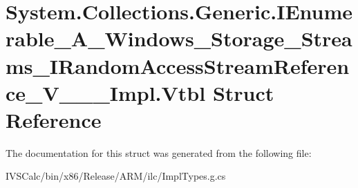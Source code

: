 \hypertarget{struct_system_1_1_collections_1_1_generic_1_1_i_enumerable___a___windows___storage___streams___i815040533663abdf6b7703e78a1bac85}{}\section{System.\+Collections.\+Generic.\+I\+Enumerable\+\_\+\+A\+\_\+\+Windows\+\_\+\+Storage\+\_\+\+Streams\+\_\+\+I\+Random\+Access\+Stream\+Reference\+\_\+\+V\+\_\+\+\_\+\+\_\+\+Impl.\+Vtbl Struct Reference}
\label{struct_system_1_1_collections_1_1_generic_1_1_i_enumerable___a___windows___storage___streams___i815040533663abdf6b7703e78a1bac85}


The documentation for this struct was generated from the following file\+:\begin{DoxyCompactItemize}
\item 
I\+V\+S\+Calc/bin/x86/\+Release/\+A\+R\+M/ilc/Impl\+Types.\+g.\+cs\end{DoxyCompactItemize}
